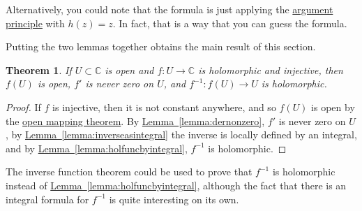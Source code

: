 \documentclass[12pt,openany]{book}
\newcommand{\C}{{\mathbb{C}}}
\theoremstyle{plain}
\newtheorem{thm}{Theorem}[section]
\theoremstyle{remark}
\theoremstyle{definition}
\theoremstyle{exercise}
\theoremstyle{example}
\newcommand{\lemmaref}[1]{\hyperref[#1]{Lemma~\ref*{#1}}}
\begin{document}
Alternatively, you could note that the formula is just applying the
\hyperref[thm:argprinc]{argument principle} with $h(z)=z$.
In fact, that is a way that you can guess the formula.

Putting the two lemmas together obtains the main result of this section.

\begin{thm}
If $U \subset \C$ is open and $f \colon U \to \C$ is holomorphic and
injective, then $f(U)$ is open, $f'$ is never zero on $U$, and $f^{-1}
\colon f(U) \to U$ is holomorphic.
\end{thm}

\begin{proof}
If $f$ is injective, then it is not constant anywhere, and so $f(U)$ is open by
the \hyperref[thm:OMT]{open mapping theorem}.
By \lemmaref{lemma:dernonzero}, $f'$ is never zero
on $U$, by \lemmaref{lemma:inverseasintegral} the inverse is locally defined
by an integral, and by
\lemmaref{lemma:holfuncbyintegral},
$f^{-1}$ is holomorphic.
\end{proof}

The inverse function theorem could be used to prove that $f^{-1}$ is
holomorphic instead of \lemmaref{lemma:holfuncbyintegral}, although the
fact that there is an integral formula for $f^{-1}$ is quite interesting on
its own.
\end{document}
